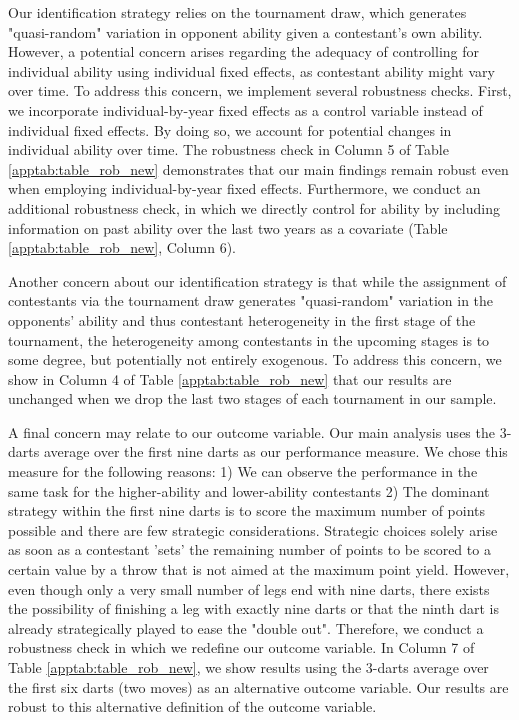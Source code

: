 \documentclass[11pt,a4paper]{article}
\begin{document}
Our identification strategy relies on the tournament draw, which generates "quasi-random" variation in opponent ability given a contestant's own ability. However, a potential concern arises regarding the adequacy of controlling for individual ability using individual fixed effects, as contestant ability might vary over time. To address this concern, we implement several robustness checks. First, we incorporate individual-by-year fixed effects as a control variable instead of individual fixed effects. By doing so, we account for potential changes in individual ability over time. The robustness check in Column 5 of Table \ref{apptab:table_rob_new} demonstrates that our main findings remain robust even when employing individual-by-year fixed effects. Furthermore, we conduct an additional robustness check, in which we directly control for ability by including information on past ability over the last two years as a covariate (Table \ref{apptab:table_rob_new}, Column 6). \par

Another concern about our identification strategy is that while the assignment of contestants via the tournament draw generates "quasi-random" variation in the opponents' ability and thus contestant heterogeneity in the first stage of the tournament, the heterogeneity among contestants in the upcoming stages is to some degree, but potentially not entirely exogenous. To address this concern, we show in Column 4 of Table \ref{apptab:table_rob_new} that our results are unchanged when we drop the last two stages of each tournament in our sample.\par

A final concern may relate to our outcome variable. Our main analysis uses the 3-darts average over the first nine darts as our performance measure. We chose this measure for the following reasons: 1) We can observe the performance in the same task for the higher-ability and lower-ability contestants 2) The dominant strategy within the first nine darts is to score the maximum number of points possible and there are few strategic considerations. Strategic choices solely arise as soon as a contestant ’sets’ the remaining number of points to be scored to a certain value by a throw that is not aimed at the maximum point yield. However, even though only a very small number of legs end with nine darts, there exists the possibility of finishing a leg with exactly nine darts or that the ninth dart is already strategically played to ease the "double out". Therefore, we conduct a robustness check in which we redefine our outcome variable. In Column 7 of Table \ref{apptab:table_rob_new}, we show results using the 3-darts average over the first six darts (two moves) as an alternative outcome variable. Our results are robust to this alternative definition of the outcome variable.\par
\end{document}
